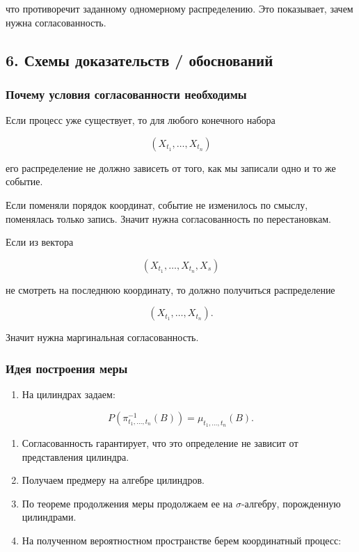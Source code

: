 \documentclass[
  11pt,
  a4paper,
]{article}
\providecommand{\tightlist}{%
  \setlength{\itemsep}{0pt}\setlength{\parskip}{0pt}}
\begin{document}
что противоречит заданному одномерному распределению. Это показывает,
зачем нужна согласованность.

\subsection{6. Схемы доказательств /
обоснований}\label{ux441ux445ux435ux43cux44b-ux434ux43eux43aux430ux437ux430ux442ux435ux43bux44cux441ux442ux432-ux43eux431ux43eux441ux43dux43eux432ux430ux43dux438ux439}

\subsubsection{Почему условия согласованности
необходимы}\label{ux43fux43eux447ux435ux43cux443-ux443ux441ux43bux43eux432ux438ux44f-ux441ux43eux433ux43bux430ux441ux43eux432ux430ux43dux43dux43eux441ux442ux438-ux43dux435ux43eux431ux445ux43eux434ux438ux43cux44b}

Если процесс уже существует, то для любого конечного набора

\[
(X_{t_1},\ldots,X_{t_n})
\]

его распределение не должно зависеть от того, как мы записали одно и то
же событие.

Если поменяли порядок координат, событие не изменилось по смыслу,
поменялась только запись. Значит нужна согласованность по перестановкам.

Если из вектора

\[
(X_{t_1},\ldots,X_{t_n},X_s)
\]

не смотреть на последнюю координату, то должно получиться распределение

\[
(X_{t_1},\ldots,X_{t_n}).
\]

Значит нужна маргинальная согласованность.

\subsubsection{Идея построения
меры}\label{ux438ux434ux435ux44f-ux43fux43eux441ux442ux440ux43eux435ux43dux438ux44f-ux43cux435ux440ux44b}

\begin{enumerate}
\def\labelenumi{\arabic{enumi}.}
\tightlist
\item
  На цилиндрах задаем:
\end{enumerate}

\[
P(\pi_{t_1,\ldots,t_n}^{-1}(B))
=
\mu_{t_1,\ldots,t_n}(B).
\]

\begin{enumerate}
\def\labelenumi{\arabic{enumi}.}
\setcounter{enumi}{1}
\item
  Согласованность гарантирует, что это определение не зависит от
  представления цилиндра.
\item
  Получаем предмеру на алгебре цилиндров.
\item
  По теореме продолжения меры продолжаем ее на \(\sigma\)-алгебру,
  порожденную цилиндрами.
\item
  На полученном вероятностном пространстве берем координатный процесс:
\end{enumerate}
\end{document}
